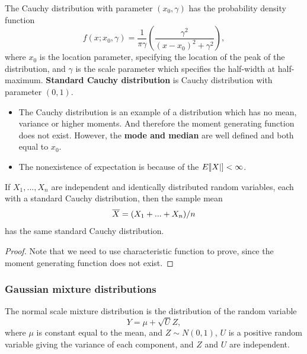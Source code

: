 \begin{refsection}
\begin{definition}
The Cauchy distribution with parameter $(x_0, \gamma)$ has the probability density function
$$f(x; x_0,\gamma) = \frac{1}{\pi \gamma} (\frac{\gamma^2}{(x-x_0)^2 + \gamma^2}),$$
where $x_0$ is the location parameter, specifying the location of the peak of the distribution, and $\gamma$ is the scale parameter which specifies the half-width at half-maximum.
\textbf{Standard Cauchy distribution} is Cauchy distribution with parameter $(0,1)$.
\end{definition}

\begin{remark}\hfill
\begin{itemize}
	\item The Cauchy distribution is an example of a distribution which has no mean, variance or higher moments. And therefore the moment generating function does not exist. However, the \textbf{mode and median} are well defined and both equal to $x_0$.  
	\item The nonexistence of expectation is because of the $E[\abs{X}] < \infty$. 
\end{itemize}
\end{remark}


\begin{lemma}\label{ch:theory-of-statistics:th:sumofstandardCauchydistribution}
If $X_1,...,X_n$ are independent and identically distributed random variables, each with a standard Cauchy distribution, then the sample mean $$\overline{X} = (X_1 + ... + X_n)/n$$ has the same standard Cauchy distribution.	
\end{lemma}
\begin{proof}
Note that we need to use characteristic function to prove, since the moment generating function does not exist.
\end{proof}


\subsubsection{Gaussian mixture distributions}

\begin{definition}\cite[99]{ruppert2015statistics}
The normal scale mixture distribution is the distribution of the random variable 
$$Y = \mu + \sqrt{U}Z,$$
where $\mu$ is constant equal to the mean, and $Z\sim N(0,1)$, $U$ is a positive random variable giving the variance of each component, and $Z$ and $U$ are independent.


\end{definition}
\end{refsection}
